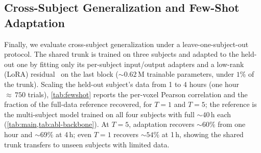 \documentclass[runningheads]{llncs}
\begin{document}
\subsection{Cross-Subject Generalization and Few-Shot Adaptation}
\label{sec:exp-ms}
Finally, we evaluate cross-subject generalization under a leave-one-subject-out protocol. The shared trunk is trained on three subjects and adapted to the held-out one by fitting only its per-subject input/output adapters and a low-rank (LoRA) residual~\cite{hu2022lora} on the last block (${\sim}0.62$\,M trainable parameters, under $1\%$ of the trunk). Scaling the held-out subject's data from 1 to 4 hours (one hour ${\approx}\,750$ trials), \cref{tab:fewshot} reports the per-voxel Pearson correlation and the fraction of the full-data reference recovered, for $T{=}1$ and $T{=}5$; the reference is the multi-subject model trained on all four subjects with full ${\sim}40$\,h each (\cref{tab:main,tab:abl-backbone}). At $T{=}5$, adaptation recovers ${\sim}60\%$ from one hour and ${\sim}69\%$ at 4\,h; even $T{=}1$ recovers ${\sim}54\%$ at 1\,h, showing the shared trunk transfers to unseen subjects with limited data.
\end{document}
